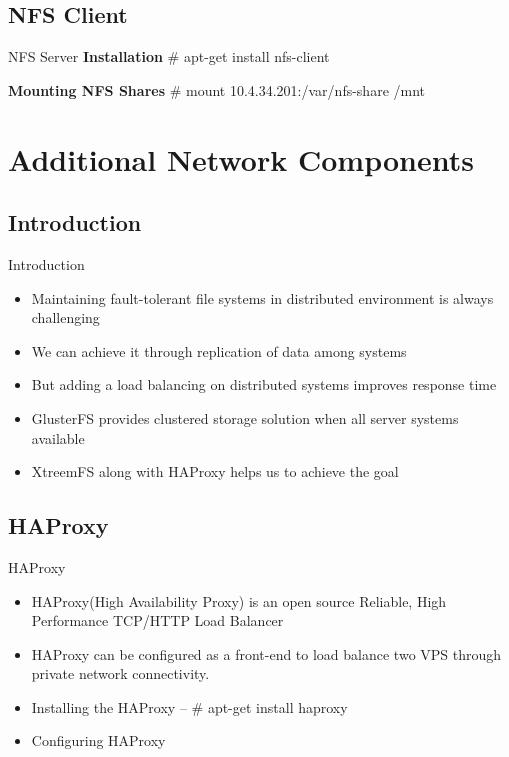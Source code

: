 \documentclass[10pt,xcolor=dvipsnames]{beamer}
\begin{document}
\subsection{NFS Client}
\begin{frame}{NFS Server}
\textbf{Installation} \newline
\# apt-get install nfs-client \newline

\textbf{Mounting NFS Shares} \newline
\# mount 10.4.34.201:/var/nfs-share /mnt

\end{frame}

\section{Additional Network Components}

\subsection{Introduction}
\begin{frame}{Introduction}
\begin{itemize}
 \item Maintaining fault-tolerant file systems in distributed  environment is always challenging
 \item We can achieve it through replication of data among systems
 \item But adding a load balancing on distributed systems improves response time
 \item GlusterFS provides clustered storage solution when all server systems available
 \item XtreemFS along with HAProxy helps us to achieve the goal
\end{itemize}
\end{frame}

\subsection{HAProxy}
\begin{frame}{HAProxy}
\begin{itemize}
\item HAProxy(High Availability Proxy) is an open source Reliable, High Performance TCP/HTTP Load Balancer
\item HAProxy can be configured as a front-end to load balance two VPS through private network connectivity.
\item Installing the HAProxy -- \# apt-get install haproxy
\item Configuring HAProxy 
\end{itemize}

\end{frame}
\end{document}
